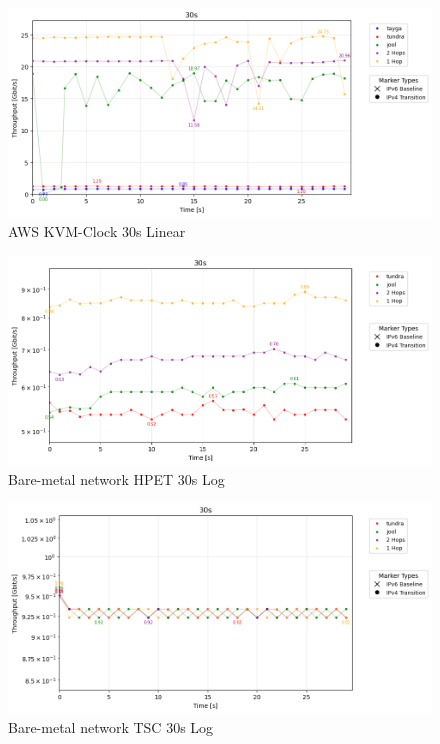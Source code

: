 \begin{figure}[H]
    \centering
    \includegraphics[width=1\textwidth]{resources/finalPlots/appendix/combined/AWS_tcp_sameScale_kvm-clock_30s_linear.png}
    \caption{AWS KVM-Clock 30s Linear}
    \label{fig:aws_tcp_kvm_30s_linear}
\end{figure}



\begin{figure}[H]
    \centering
    \includegraphics[width=1\textwidth]{resources/finalPlots/appendix/combined/DoubleLocal_tcp_sameScale_hpet_30s_log.png}
    \caption{Bare-metal network HPET 30s Log}
    \label{fig:double_local_tcp_hpet_30s_log}
\end{figure}



\begin{figure}[H]
    \centering
    \includegraphics[width=1\textwidth]{resources/finalPlots/appendix/combined/DoubleLocal_tcp_sameScale_tsc_30s_log.png}
    \caption{Bare-metal network TSC 30s Log}
    \label{fig:double_local_tcp_tsc_30s_log}
\end{figure}


